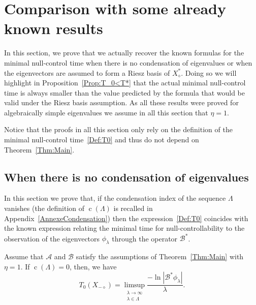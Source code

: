 \documentclass[AHL,Unicode,longabstracts]{cedram}
\newcommand\A{\mathcal{A}}
\newcommand\B{\mathcal{B}}
\newcommand\Bs{\mathcal{B}^*}
\newcommand{\Xalphas}{X_\diamond^*}
\newcommand{\Xmalpha}{X_{-\diamond}}
\DeclareMathOperator{\cond}{c}
\begin{document}
\section{Comparison with some already known results} \label{Sec:AutresExpressions}

In this section, we prove that we actually recover the known formulas for the minimal null-control time when there is no condensation of eigenvalues or when the eigenvectors are assumed to form a Riesz basis of $\Xalphas$. Doing so we will highlight in Proposition~\ref{Prop:T_0<T*} that the actual minimal null-control time is always smaller than the value predicted by the formula that would be valid under the Riesz basis assumption. As all these results were proved for algebraically simple eigenvalues we assume in all this section that $\eta=1$.

Notice that the proofs in all this section only rely on the definition of the minimal null-control time~\eqref{Def:T0} and thus do not depend on Theorem~\ref{Thm:Main}.


\subsection{When there is no condensation of eigenvalues} \label{Subsec:NoCondensation}

In this section we prove that, if the condensation index of the sequence $\Lambda$ vanishes (the definition of $\cond(\Lambda)$ is recalled in Appendix~\ref{AnnexeCondensation}) then the expression~\eqref{Def:T0} coincides with the known expression relating the minimal time for null-controllability to the observation of the eigenvectors $\phi_\lambda$ through the operator $\Bs$.

\begin{prop}
Assume that $\A$ and $\B$ satisfy the assumptions of Theorem~\ref{Thm:Main} with $\eta=1$. If $\cond(\Lambda) =0$, then, we have
\[
T_{0}(\Xmalpha)=\limsup_{\substack{\lambda\to \infty\\ \lambda\in \Lambda}} \frac{-\ln \left| \Bs \phi_\lambda \right|}{\lambda}.
\]
\end{prop}
\end{document}
